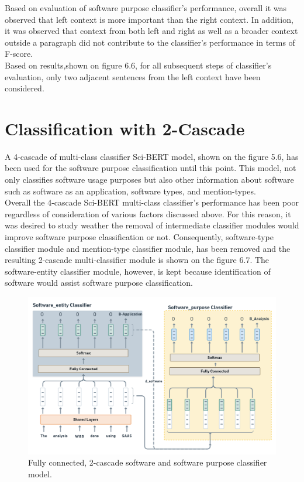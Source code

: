 Based on evaluation of software purpose classifier's performance, overall it was observed that left context is more important than the right context. In addition, it was observed that context from both left and right as well as a broader context outside a paragraph did not contribute to the classifier's performance in terms of F-score. \\

Based on results,shown on figure 6.6, for all subsequent steps of classifier's evaluation, only two adjacent sentences from the left context have been considered. \\


\section{Classification with 2-Cascade}
\label{sec:chapter06:2lc}

A 4-cascade of multi-class classifier \ac{Sci-BERT} model, shown on the figure 5.6, has been used for the software purpose classification until this point. This model, not only classifies software usage purposes but also other information about software such as software as an application, software types, and mention-types. \\


Overall the 4-cascade \ac{Sci-BERT} multi-class classifier’s performance has been poor regardless of consideration of various factors discussed above. For this reason, it was desired to study weather the removal of intermediate classifier modules would improve software purpose classification or not. Consequently, software-type classifier module and mention-type classifier module, has been removed and the resulting 2-cascade multi-classifier module is shown on the figure 6.7. The software-entity classifier module, however, is kept because identification of software would assist software purpose classification.  \\

\begin{figure}[htbp]
	\centering
	\includegraphics[width=.65\textwidth]{4.graphics/figures/ch_5/2LC}
	\caption{Fully connected, 2-cascade software and software purpose classifier model.}
	\label{fig:chapter06:with}
\end{figure}

